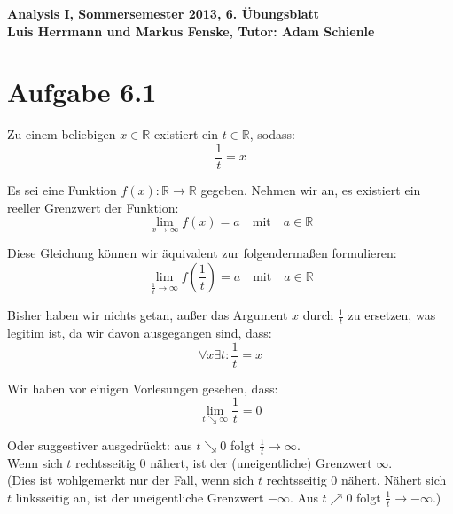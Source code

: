 \documentclass[a4paper,german,12pt,smallheadings]{scrartcl}
\begin{document}
\begin{center}
\bfseries %
\sffamily %
\vspace{-40pt}
Analysis I, Sommersemester 2013, 6. Übungsblatt \\
Luis Herrmann und Markus Fenske, Tutor: Adam Schienle
\vspace{-10pt}
\end{center}

\section{Aufgabe 6.1}

Zu einem beliebigen $x\in \mathbb{R}$ existiert ein $t\in \mathbb{R}$, sodass:
\begin{equation*}
\frac{1}{t}=x
\end{equation*}

Es sei eine Funktion $f(x):\mathbb{R}\rightarrow\mathbb{R}$ gegeben. Nehmen wir an, es existiert ein reeller Grenzwert der Funktion:
\begin{equation*}
\lim\limits_{x \to \infty} f(x)=a \quad \text{mit} \quad a\in\mathbb{R}
\end{equation*}

Diese Gleichung können wir äquivalent zur folgendermaßen formulieren:
\begin{equation*}
\lim\limits_{\frac{1}{t} \to \infty} f\left(\frac{1}{t}\right)=a \quad \text{mit} \quad a\in\mathbb{R}
\end{equation*}

Bisher haben wir nichts getan, außer das Argument $x$ durch $\frac{1}{t}$ zu ersetzen, was legitim ist, da wir davon ausgegangen sind, dass:
\begin{equation*}
\forall x \exists t : \frac{1}{t}=x
\end{equation*}

Wir haben vor einigen Vorlesungen gesehen, dass:
\begin{equation*}
\lim\limits_{t \searrow \infty} \frac{1}{t}=0
\end{equation*}

Oder suggestiver ausgedrückt: aus $t\searrow 0$ folgt $\frac{1}{t}\rightarrow \infty$. \\
Wenn sich $t$ rechtsseitig 0 nähert, ist der (uneigentliche) Grenzwert $\infty$.\\

(Dies ist wohlgemerkt nur der Fall, wenn sich $t$ rechtsseitig 0 nähert. Nähert sich $t$ linksseitig an, ist der uneigentliche Grenzwert $-\infty$. Aus $t\nearrow  0$  folgt $\frac{1}{t} \rightarrow -\infty$.)\\
\end{document}
